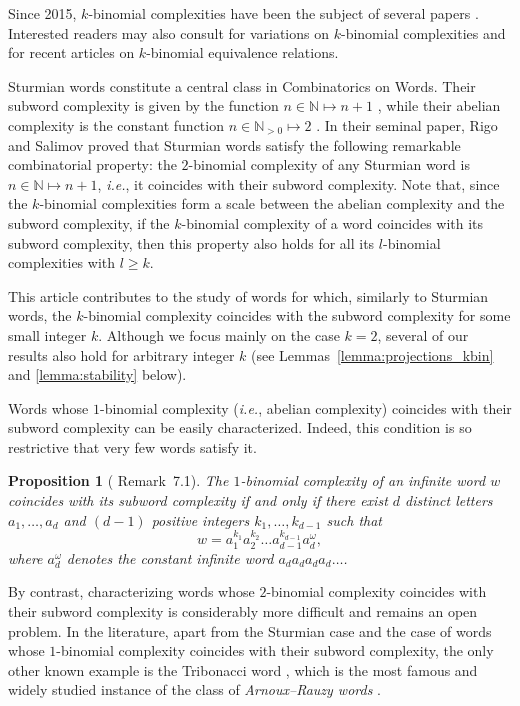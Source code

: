\documentclass{template_arxiv}
\newtheorem{proposition}[lemma]{Proposition}
\theoremstyle{definition}
\newcommand{\N}{\mathbb{N}}
\begin{document}
\medskip

Since 2015, $k$-binomial complexities have been the subject of several papers \cite{LLR20,LRR20,LCWW24,RSW24,GRW24}. Interested readers may also consult \cite{RSW23,RRW25} for variations on $k$-binomial complexities and \cite{LRR20b,Whi21} for recent articles on $k$-binomial equivalence relations.

\medskip

Sturmian words constitute a central class in Combinatorics on Words. Their subword complexity is given by the function $n\in\N\mapsto n+1$ \cite{MH40}, while their abelian complexity is the constant function $n\in\N_{>0}\mapsto 2$ \cite{CH73}. In their seminal paper, Rigo and Salimov proved that Sturmian words satisfy the following remarkable combinatorial property: the $2$-binomial complexity of any Sturmian word is $n\in\N\mapsto n+1$, \emph{i.e.}, it coincides with their subword complexity. Note that, since the $k$-binomial complexities form a scale between the abelian complexity and the subword complexity, if the $k$-binomial complexity of a word coincides with its subword complexity, then this property also holds for all its $l$-binomial complexities with $l\geq k$.

\medskip

This article contributes to the study of words for which, similarly to Sturmian words, the $k$-binomial complexity coincides with the subword complexity for some small integer $k$. Although we focus mainly on the case $k=2$, several of our results also hold for arbitrary integer $k$ (see Lemmas~\ref{lemma:projections_kbin} and \ref{lemma:stability} below).

\medskip

Words whose $1$-binomial complexity (\emph{i.e.}, abelian complexity) coincides with their subword complexity can be easily characterized. Indeed, this condition is so restrictive that very few words satisfy it.

\begin{proposition}[\cite{RSW24} Remark~7.1]\label{prop:1bin}
The $1$-binomial complexity of an infinite word $w$ coincides with its subword complexity if and only if there exist $d$ distinct letters $a_1,\ldots,a_d$ and $(d-1)$ positive integers $k_1,\ldots,k_{d-1}$ such that
\[
    w=a_1^{k_1}a_2^{k_2}\ldots a_{d-1}^{k_{d-1}}a_d^\omega,
\]
where $a_d^\omega$ denotes the constant infinite word $a_da_da_da_d\ldots$.
\end{proposition}

By contrast, characterizing words whose $2$-binomial complexity coincides with their subword complexity is considerably more difficult and remains an open problem. In the literature, apart from the Sturmian case and the case of words whose $1$-binomial complexity coincides with their subword complexity, the only other known example is the Tribonacci word \cite{Rau82}, which is the most famous and widely studied instance of the class of \emph{Arnoux--Rauzy words} \cite{AR91}.
\end{document}
